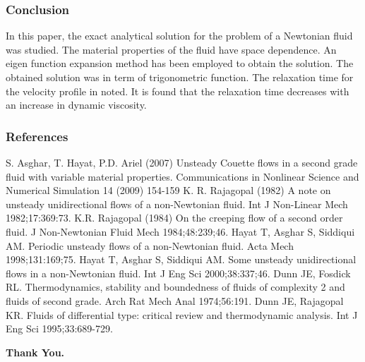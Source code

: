\documentclass[10pt]{beamer}
\begin{document}
		\begin{frame}
			\frametitle{\textbf{Conclusion}}
	In this paper, the exact analytical solution for the problem of a Newtonian fluid was studied. The material properties of the fluid have space dependence. An eigen function expansion method has been employed to obtain the solution. The obtained solution was in term of trigonometric function. The relaxation time for the velocity profile in noted. It is found that the relaxation time decreases with an increase in dynamic viscosity.
			
		\end{frame}
		
		\begin{frame}
			\frametitle{\textbf{References}}
			\begin{thebibliography}{99}
				\bibitem {} S. Asghar, T. Hayat, P.D. Ariel (2007) Unsteady Couette flows in a second grade fluid with variable material properties. Communications in Nonlinear Science and Numerical Simulation 14 (2009) 154-159
				\bibitem {} K. R. Rajagopal (1982) A note on unsteady unidirectional flows of a non-Newtonian fluid. Int J Non-Linear Mech 1982;17:369:73.
				\bibitem {} K.R. Rajagopal (1984) On the creeping flow of a second order fluid. J Non-Newtonian Fluid Mech 1984;48:239;46.
				\bibitem {} Hayat T, Asghar S, Siddiqui AM. Periodic unsteady flows of a non-Newtonian fluid. Acta Mech 1998;131:169;75.
				\bibitem {} Hayat T, Asghar S, Siddiqui AM. Some unsteady unidirectional flows in a non-Newtonian fluid. Int J Eng Sci 2000;38:337;46.
				\bibitem {} Dunn JE, Fosdick RL. Thermodynamics, stability and boundedness of fluids of complexity 2 and fluids of second grade. Arch Rat Mech Anal 1974;56:191.
				\bibitem {} Dunn JE, Rajagopal KR. Fluids of differential type: critical review and thermodynamic analysis. Int J Eng Sci 1995;33:689-729. 
			\end{thebibliography}
		\end{frame}
				
		
		\begin{frame}
			\centering\textbf{\large{	Thank You.}}

		
		\end{frame}
	
\end{document}
